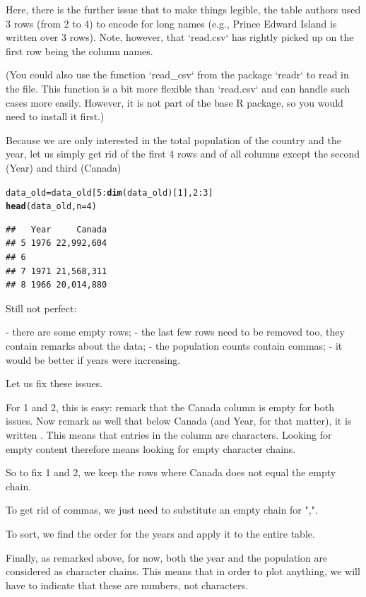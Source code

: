 \documentclass[aspectratio=169]{beamer}\usepackage[]{graphicx}\usepackage[]{xcolor}
\makeatletter
\newcommand{\hlnum}[1]{\textcolor[rgb]{0.686,0.059,0.569}{#1}}%
\newcommand{\hlopt}[1]{\textcolor[rgb]{0,0,0}{#1}}%
\newcommand{\hlstd}[1]{\textcolor[rgb]{0.345,0.345,0.345}{#1}}%
\newcommand{\hlkwb}[1]{\textcolor[rgb]{0.69,0.353,0.396}{#1}}%
\newcommand{\hlkwc}[1]{\textcolor[rgb]{0.333,0.667,0.333}{#1}}%
\newcommand{\hlkwd}[1]{\textcolor[rgb]{0.737,0.353,0.396}{\textbf{#1}}}%
\newenvironment{kframe}{%
 \def\at@end@of@kframe{}%
 \ifinner\ifhmode%
  \def\at@end@of@kframe{\end{minipage}}%
  \begin{minipage}{\columnwidth}%
 \fi\fi%
 \def\FrameCommand##1{\hskip\@totalleftmargin \hskip-\fboxsep
 \colorbox{shadecolor}{##1}\hskip-\fboxsep
     \hskip-\linewidth \hskip-\@totalleftmargin \hskip\columnwidth}%
 \MakeFramed {\advance\hsize-\width
   \@totalleftmargin\z@ \linewidth\hsize
   \@setminipage}}%
 {\par\unskip\endMakeFramed%
 \at@end@of@kframe}
\newenvironment{knitrout}{}{} %
\makeatother
\begin{document}
\begin{frame}[fragile]
Here, there is the further issue that to make things legible, the table authors used 3 rows (from 2 to 4) to encode for long names (e.g., Prince Edward Island is written over 3 rows). Note, however, that `read.csv` has rightly picked up on the first row being the column names.

(You could also use the function `read\_csv` from the package `readr` to read in the file. This function is a bit more flexible than `read.csv` and can handle such cases more easily. However, it is not part of the base R package, so you would need to install it first.)

Because we are only interested in the total population of the country and the year, let us simply get rid of the first 4 rows and of all columns except the second (Year) and third (Canada)

\begin{knitrout}
\color{fgcolor}\begin{kframe}
\begin{alltt}
\hlstd{data_old} \hlkwb{=} \hlstd{data_old[}\hlnum{5}\hlopt{:}\hlkwd{dim}\hlstd{(data_old)[}\hlnum{1}\hlstd{],} \hlnum{2}\hlopt{:}\hlnum{3}\hlstd{]}
\hlkwd{head}\hlstd{(data_old,} \hlkwc{n}\hlstd{=}\hlnum{4}\hlstd{)}
\end{alltt}
\begin{verbatim}
##   Year     Canada
## 5 1976 22,992,604
## 6                
## 7 1971 21,568,311
## 8 1966 20,014,880
\end{verbatim}
\end{kframe}
\end{knitrout}
\end{frame}


\begin{frame}
Still not perfect:

- there are some empty rows;
- the last few rows need to be removed too, they contain remarks about the data;
- the population counts contain commas;
- it would be better if years were increasing.

Let us fix these issues.

For 1 and 2, this is easy: remark that the Canada column is empty for both issues. Now remark as well that below Canada (and Year, for that matter), it is written . This means that entries in the column are characters. Looking for empty content therefore means looking for empty character chains.

So to fix 1 and 2, we keep the rows where Canada does not equal the empty chain.

To get rid of commas, we just need to substitute an empty chain for ",".

To sort, we find the order for the years and apply it to the entire table.

Finally, as remarked above, for now, both the year and the population are considered as character chains. This means that in order to plot anything, we will have to indicate that these are numbers, not characters.
\end{frame}
\end{document}
